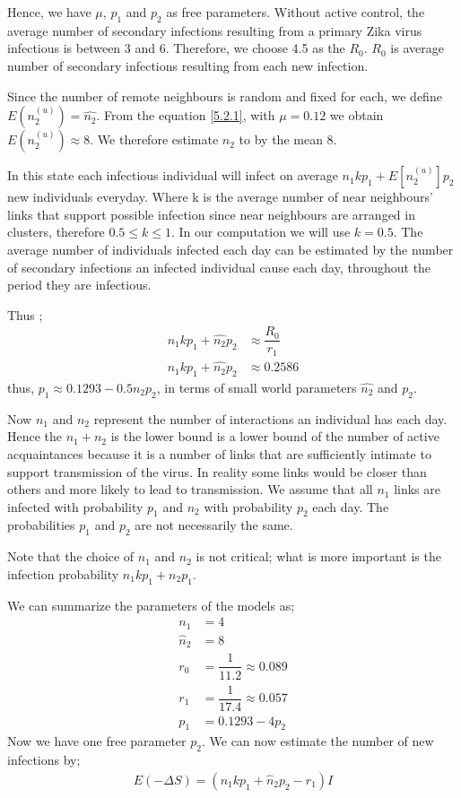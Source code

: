   Hence, we have $\mu$, $p_1$ and $p_2$  as free parameters. Without active control, the average number of secondary infections resulting from a primary  Zika  virus infectious is between 3 and 6. Therefore, we choose 4.5 as the $R_0$. $R_0$ is average number of secondary infections resulting from each new infection.
  
  Since the number of remote neighbours is random and fixed for each, we define $E (n^ {(u)} _2) = \widehat{n_2}$. From the equation \ref{5.2.1}, with $\mu = 0.12$ we obtain $E (n^ {(u)} _2) \approx 8$. We therefore estimate $n_2$ to by the mean $8$.
  
  In this state each infectious individual will infect on average $n_1kp_1 + E[n^{(u)}_2]p_2 $ new individuals everyday. Where k is the average number of near neighbours' links that support possible infection since 
  near neighbours are arranged in clusters, therefore $0.5 \leq k \leq 1$. In our computation we will use $k=0.5$.
    The average number  of individuals infected each day can be estimated by the number of secondary infections an infected individual cause each day, throughout the period they are infectious.

  Thus ;
\begin{align}
n_1k p_1 + \widehat{n_2} p_2 &\approx \dfrac{R_0}{r_1} 
\\ n_1k p_1 + \widehat{n_2} p_2 &\approx 0.2586 \label{eqn 5.32}
\end{align}
thus, 
$p_1 \approx   0.1293 - 0.5 \widehat{n_2} p_2$, in terms of small world parameters $\widehat{n_2}$ and $p_2$.

Now $n_1$ and $n_2$ represent the number of interactions an individual has each day. Hence the  $n_1 + n_2$ is the lower bound is a lower bound of the number of active acquaintances because it is a number of links that are sufficiently intimate to support transmission of the virus. In reality some links would be closer than others and more likely to lead to transmission. We assume that all $n_1$ links are infected with probability $p_1$ and $n_2$ with probability $p_2$ each day. The probabilities $p_1$ and $p_2$ are not necessarily  the same.

Note that the choice of $n_1$ and $n_2$ is not critical; what is more important is the infection probability $n_1kp_1 + n_2p_1$.

We can summarize the parameters of the models as;
\begin{align}
n_1 &= 4 \\
\widehat{n}_2 &= 8 \\
r_0 &= \dfrac{1}{11.2} \approx 0.089 \\
r_1 &= \dfrac{1}{17.4} \approx 0.057 \\
p_1 &= 0.1293 - 4 p_2 \label{eqn 5.1.7}
\end{align}
Now we have one free parameter $p_2$. We can now estimate the number of new infections by;
\begin{align}
E(- \Delta S) = (n_1 k p_1 + \widehat{n}_2    p_2 - r_1) I \label{5.18}
\end{align}

